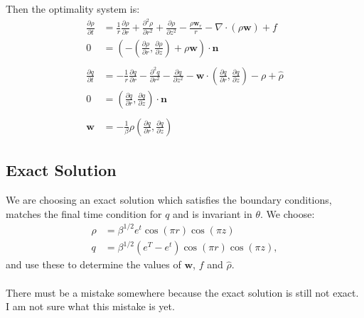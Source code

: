 \documentclass[11pt, a4paper]{article}
\theoremstyle{definition}
\newcommand{\w}{\mathbf{w}}
\newcommand{\n}{\mathbf{n}}
\newcommand{\hr}{\widehat \rho}
\begin{document}
Then the optimality system is:
\begin{align*}
	\frac{\partial \rho}{\partial t} &= \frac{1}{r} \frac{\partial \rho}{\partial r} +  \frac{\partial^2 \rho}{\partial r^2} + \frac{\partial \rho}{\partial z^2} - \frac{\rho\w_r}{r} - \nabla \cdot (\rho \w ) + f\\
	0 &= \left(- \left(\frac{\partial \rho}{\partial r},  \frac{\partial \rho}{\partial z}\right) + \rho \w \right) \cdot \n \\
	\\
	\frac{\partial q}{\partial t} &= - \frac{1}{r} \frac{\partial q}{\partial r} -  \frac{\partial^2 q}{\partial r^2} - \frac{\partial q}{\partial z^2} - \w \cdot \left(\frac{\partial q}{\partial r},  \frac{\partial q}{\partial z}\right) - \rho + \hr\\
	0 &= \left(\frac{\partial q}{\partial r},  \frac{\partial q}{\partial z}\right) \cdot \n \\
	\\
	\w &= - \frac{1}{\beta}\rho  \left(\frac{\partial q}{\partial r},  \frac{\partial q}{\partial z}\right)
\end{align*}

\subsection{Exact Solution}
We are choosing an exact solution which satisfies the boundary conditions, matches the final time condition for $q$ and is invariant in $\theta$. We choose:
\begin{align*}
	\rho &= \beta^{1/2} e^t \cos(\pi r) \cos (\pi z)\\
	q &= \beta^{1/2}(e^T - e^t)\cos(\pi r)\cos(\pi z),
\end{align*}
and use these to determine the values of $\w$, $f$ and $\hr$.
\\
\\
There must be a mistake somewhere because the exact solution is still not exact. I am not sure what this mistake is yet.

	
\end{document}
